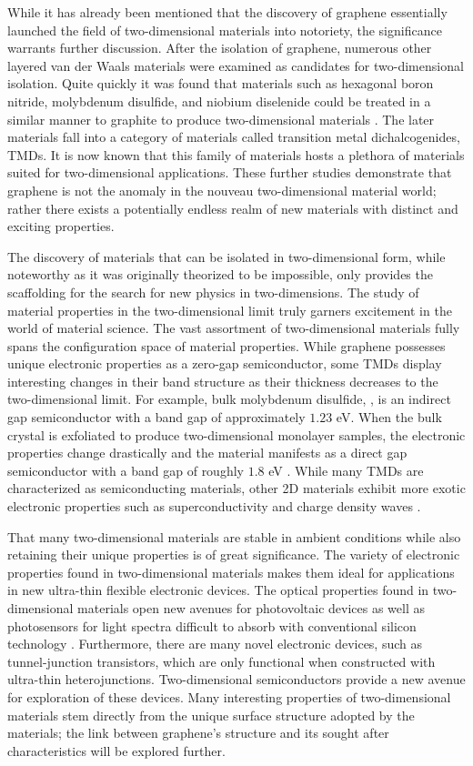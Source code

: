  While it has already been mentioned that the discovery of graphene essentially launched the field of two-dimensional materials into notoriety, the significance warrants further discussion. After the isolation of graphene, numerous other layered van der Waals materials were examined as candidates for two-dimensional isolation. Quite quickly it was found that materials such as hexagonal boron nitride, molybdenum disulfide, and niobium diselenide could be treated in a similar manner to graphite to produce two-dimensional materials \cite{novoselov-2d}. The later materials fall into a category of materials called transition metal dichalcogenides, TMDs. It is now known that this family of materials hosts a plethora of materials suited for two-dimensional applications. These further studies demonstrate that graphene is not the anomaly in the nouveau two-dimensional material world; rather there exists a potentially endless realm of new materials with distinct and exciting properties.

  The discovery of materials that can be isolated in two-dimensional form, while noteworthy as it was originally theorized to be impossible, only provides the scaffolding for the search for new physics in two-dimensions. The study of material properties in the two-dimensional limit truly garners excitement in the world of material science. The vast assortment of two-dimensional materials fully spans the configuration space of material properties. While graphene possesses unique electronic properties as a zero-gap semiconductor, some TMDs display interesting changes in their band structure as their thickness decreases to the two-dimensional limit. For example, bulk molybdenum disulfide, , is an indirect gap semiconductor with a band gap of approximately $1.23$ eV. When the bulk crystal is exfoliated to produce two-dimensional monolayer samples, the electronic properties change drastically and the material manifests as a direct gap semiconductor with a band gap of roughly $1.8$ eV \cite{monolayer-mos2, 2d-atlas}. While many TMDs are characterized as semiconducting materials, other 2D materials exhibit more exotic electronic properties such as superconductivity and charge density waves \cite{2D-TMDs}.

  That many two-dimensional materials are stable in ambient conditions while also retaining their unique properties is of great significance. The variety of electronic properties found in two-dimensional materials makes them ideal for applications in new ultra-thin flexible electronic devices. The optical properties found in two-dimensional materials open new avenues for photovoltaic devices as well as photosensors for light spectra difficult to absorb with conventional silicon technology \cite{ graphene-2d-optoelectronics}. Furthermore, there are many novel electronic devices, such as tunnel-junction transistors, which are only functional when constructed with ultra-thin heterojunctions. Two-dimensional semiconductors provide a new avenue for exploration of these devices. Many interesting properties of two-dimensional materials stem directly from the unique surface structure adopted by the materials; the link between graphene's structure and its sought after characteristics will be explored further.

